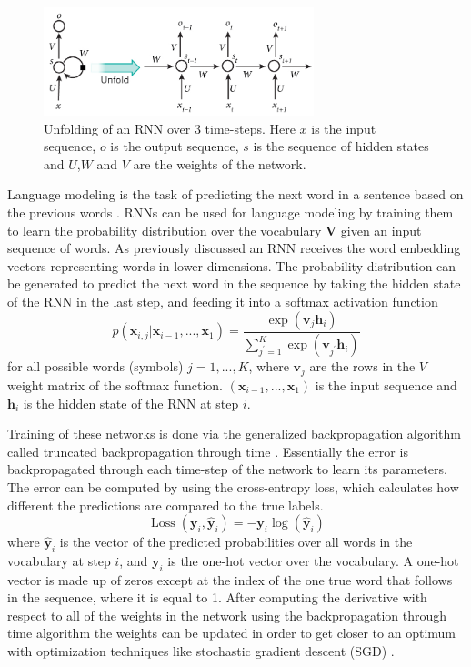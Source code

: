 \documentclass[12pt]{article}
\DeclareMathOperator{\Loss}{Loss}
\begin{document}
\begin{figure}[H]
	\centering
	\includegraphics[width=0.7\textwidth]{pics/rnn.jpg}
	\caption{Unfolding of an RNN over 3 time-steps. Here \(x\) is the input sequence, \(o\) is the output sequence, \(s\) is the sequence of hidden states and \(U\),\(W\) and \(V\) are the weights of the network. \cite{RNN_pic:2017}}
	\label{fig:231}
\end{figure}

Language modeling is the task of predicting the next word in a sentence based on the previous words \cite{Bengio:2003}. RNNs can be used for language modeling by training them to learn the probability distribution over the vocabulary \(\bm{V}\) given an input sequence of words. As previously discussed an RNN receives the word embedding vectors representing words in lower dimensions. The probability distribution can be generated to predict the next word in the sequence by taking the hidden state of the RNN in the last step, and feeding it into a softmax activation function
\begin{equation} \label{eq231b}
p(\bm{x}_{i,j}|\bm{x}_{i-1},...,\bm{x}_1)=\frac{\exp(\bm{v}_j\bm{h}_i)}{\sum_{j^{'}=1}^{K}\exp(\bm{v}_{j^{'}}\bm{h}_i)}
\end{equation}
for all possible words (symbols) \(j=1,...,K\), where \(\bm{v}_j\) are the rows in the \(V\) weight matrix of the softmax function. \((\bm{x}_{i-1},...,\bm{x}_1)\) is the input sequence and \(\bm{h}_i\) is the hidden state of the RNN at step \(i\).

Training of these networks is done via the generalized backpropagation algorithm called truncated backpropagation through time \cite{Werbos:1990,RNN:1988}. Essentially the error is backpropagated through each time-step of the network to learn its parameters. The error can be computed by using the cross-entropy loss, which calculates how different the predictions are compared to the true labels.
\begin{equation} \label{eq231c}
\Loss(\bm{y}_i,\bm{\hat{y}}_{i})=-\bm{y}_i \log(\bm{\hat{y}}_{i})
\end{equation}
where \(\bm{\hat{y}}_{i}\) is the vector of the predicted probabilities over all words in the vocabulary at step \(i\), and \(\bm{y}_i\) is the one-hot vector over the vocabulary. A one-hot vector is made up of zeros except at the index of the one true word that follows in the sequence, where it is equal to 1. After computing the derivative with respect to all of the weights in the network using the backpropagation through time algorithm the weights can be updated in order to get closer to an optimum with optimization techniques like stochastic gradient descent (SGD) \cite{SGD:2010}. 
\end{document}
